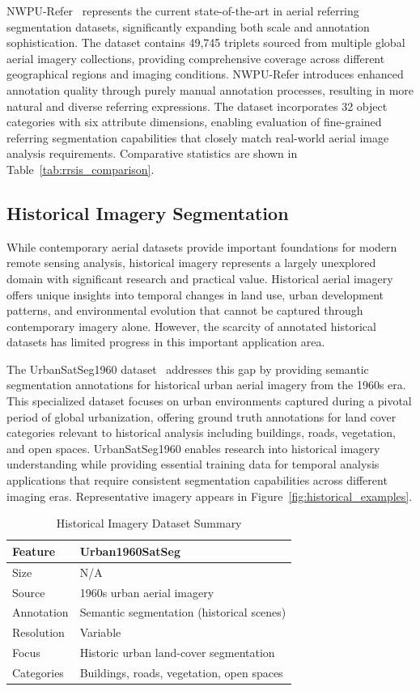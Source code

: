 NWPU-Refer~\cite{yang2024large} represents the current state-of-the-art in aerial referring segmentation datasets, significantly expanding both scale and annotation sophistication. The dataset contains 49,745 triplets sourced from multiple global aerial imagery collections, providing comprehensive coverage across different geographical regions and imaging conditions. NWPU-Refer introduces enhanced annotation quality through purely manual annotation processes, resulting in more natural and diverse referring expressions. The dataset incorporates 32 object categories with six attribute dimensions, enabling evaluation of fine-grained referring segmentation capabilities that closely match real-world aerial image analysis requirements. Comparative statistics are shown in Table~\ref{tab:rrsis_comparison}.

\subsection{Historical Imagery Segmentation}

While contemporary aerial datasets provide important foundations for modern remote sensing analysis, historical imagery represents a largely unexplored domain with significant research and practical value. Historical aerial imagery offers unique insights into temporal changes in land use, urban development patterns, and environmental evolution that cannot be captured through contemporary imagery alone. However, the scarcity of annotated historical datasets has limited progress in this important application area.

The UrbanSatSeg1960 dataset~\cite{hao2025urban1960satseg} addresses this gap by providing semantic segmentation annotations for historical urban aerial imagery from the 1960s era. This specialized dataset focuses on urban environments captured during a pivotal period of global urbanization, offering ground truth annotations for land cover categories relevant to historical analysis including buildings, roads, vegetation, and open spaces. UrbanSatSeg1960 enables research into historical imagery understanding while providing essential training data for temporal analysis applications that require consistent segmentation capabilities across different imaging eras. Representative imagery appears in Figure~\ref{fig:historical_examples}.

\begin{table}[htbp]
\centering
\caption{Historical Imagery Dataset Summary}
\label{tab:historic_comparison}
\begin{tabular}{@{}ll@{}}
\toprule
\textbf{Feature} & \textbf{Urban1960SatSeg} \\
\midrule
Size & N/A \\
Source & 1960s urban aerial imagery \\
Annotation & Semantic segmentation (historical scenes) \\
Resolution & Variable \\
Focus & Historic urban land-cover segmentation \\
Categories & Buildings, roads, vegetation, open spaces \\
\bottomrule
\end{tabular}
\end{table}

